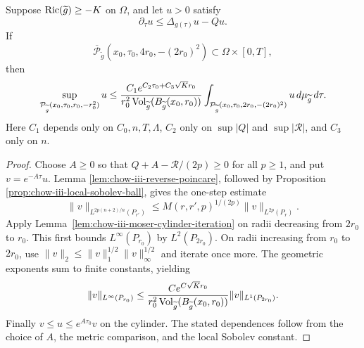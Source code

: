 \begin{theorem}
\label{thm:chow-iii-evolving-parabolic-mean-value}


Suppose \(\operatorname{Ric}(\widetilde g)\geq-K\) on \(\Omega\), and let \(u>0\)
satisfy
\[
 \partial_\tau u\leq\Delta_{g(\tau)}u-Qu.
\]
If
\[
 \overline{\mathcal P}_{\widetilde g}
 (x_0,\tau_0,4r_0,-(2r_0)^2)\subset\Omega\times[0,T],
\]
then
\[
 \sup_{\mathcal P_{\widetilde g}(x_0,\tau_0,r_0,-r_0^2)}u
 \leq
 \frac{C_1e^{C_2\tau_0+C_3\sqrt K r_0}}
 {r_0^2\operatorname{Vol}_{\widetilde g}(B_{\widetilde g}(x_0,r_0))}
 \int_{\mathcal P_{\widetilde g}(x_0,\tau_0,2r_0,-(2r_0)^2)}
 u\,d\mu_{\widetilde g}\,d\tau.
\]
Here \(C_1\) depends only on \(C_0,n,T,\Lambda\), \(C_2\) only on
\(\sup|Q|\) and \(\sup|\mathcal R|\), and \(C_3\) only on \(n\).
\end{theorem}
\begin{proof}
\sketch Choose \(A\geq0\) so that \(Q+A-\mathcal R/(2p)\geq0\) for all
\(p\geq1\), and put \(v=e^{-A\tau}u\).  Lemma
\ref{lem:chow-iii-reverse-poincare}, followed by Proposition
\ref{prop:chow-iii-local-sobolev-ball}, gives the one-step estimate
\[
 \|v\|_{L^{2p(n+2)/n}(P_{r'})}
 \leq M(r,r',p)^{1/(2p)}\|v\|_{L^{2p}(P_r)}.
\]
Apply Lemma~\ref{lem:chow-iii-moser-cylinder-iteration} on radii decreasing
from \(2r_0\) to \(r_0\).  This first bounds \(L^\infty(P_{r_0})\) by
\(L^2(P_{2r_0})\).  On radii increasing from \(r_0\) to \(2r_0\), use
\(\|v\|_2\leq\|v\|_1^{1/2}\|v\|_\infty^{1/2}\) and iterate once more.
The geometric exponents sum to finite constants, yielding
\[
 \|v\|_{L^\infty(P_{r_0})}
 \leq \frac{C e^{C\sqrt K r_0}}
 {r_0^2\operatorname{Vol}_{\widetilde g}(B_{\widetilde g}(x_0,r_0))}
 \|v\|_{L^1(P_{2r_0})}.
\]
Finally \(v\leq u\leq e^{A\tau_0}v\) on the cylinder.  The stated
dependences follow from the choice of \(A\), the metric comparison, and the
local Sobolev constant.
\end{proof}

